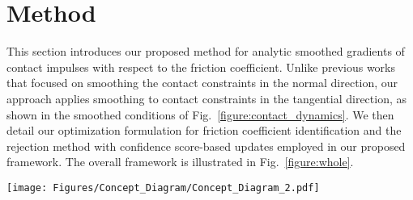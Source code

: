 


\section{Method} \label{Sec:Method}

This section introduces our proposed method for analytic smoothed gradients of contact impulses with respect to the friction coefficient. Unlike previous works~\cite{kim2022contact,kim2023contactimplicit} that focused on smoothing the contact constraints in the normal direction, our approach applies smoothing to contact constraints in the tangential direction, as shown in the smoothed conditions of Fig.~\ref{figure:contact_dynamics}. We then detail our optimization formulation for friction coefficient identification and the rejection method with confidence score-based updates employed in our proposed framework. The overall framework is illustrated in Fig.~\ref{figure:whole}.
\begin{figure*}
    \centering
    \texttt{[image: Figures/Concept\_Diagram/Concept\_Diagram\_2.pdf]}
    \caption{An overall proposed framework of the online friction coefficient identification for legged robots. Based on adaptive online system identification~\cite{chen2022real} using confidence score-based update, this work proposes analytic smoothed gradients with respect to friction coefficient and employs the rejection method. The rejection method calculates the rejection score based on the contact velocity in the normal direction and excludes the states where the rejection score exceeds a certain threshold. The processed data is utilized in the optimization problem, employing a hard contact model within the propagations of dynamics. When computing the gradient in the optimization problem, we specifically utilize the smoothed gradient of contact impulse with respect to the friction coefficient.}
    \label{figure:whole}
\end{figure*}

